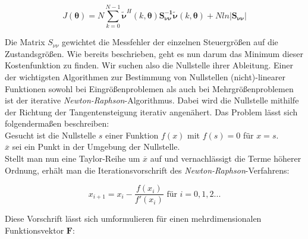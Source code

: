 \begin{equation}
    J(\mathbf{\theta})=N \sum\limits_{k=0}^{N-1}\mathbf{\tilde{\nu}}^H(k,\mathbf{\theta})\mathbf{S_{\nu\nu}^{-1}}\mathbf{\tilde{\nu}}(k,\mathbf{\theta})+Nln|\mathbf{S_{\nu\nu}}|
	\label{eq:Kostenfunktion}
\end{equation}  

Die Matrix $S_{\nu\nu}$ gewichtet die Messfehler der einzelnen Steuergrößen auf die Zustandsgrößen. 
Wie bereits beschrieben, geht es nun darum das Minimum dieser Kostenfunktion zu finden. Wir suchen also die Nullstelle ihrer 
Ableitung. Einer der wichtigsten Algorithmen zur Bestimmung von Nullstellen (nicht)-linearer Funktionen sowohl bei 
Eingrößenproblemen als auch bei Mehrgrößenproblemen ist der iterative \textit{Newton-Raphson}-Algorithmus. Dabei wird die 
Nullstelle 
mithilfe der Richtung der Tangentensteigung iterativ angenähert. Das Problem lässt sich folgendermaßen beschreiben: \noindent 
\\

\noindent \tab Gesucht ist die Nullstelle $ s $ einer Funktion $f(x)$ mit $f(s)=0$ für $x=s$. \\
\tab $\overline{x}$ sei ein Punkt in der Umgebung der Nullstelle.\\

Stellt man nun eine Taylor-Reihe um $\overline{x}$ auf und vernachlässigt die Terme höherer Ordnung, erhält man die 
Iterationsvorschrift des \textit{Newton-Raphson}-Verfahrens:

 \begin{equation}
	x_{i+1} = x_{i} - \frac{f(x_{i})}{f'(x_{i})} \text{ für }i=0,1,2...
	\label{eq:Newton_Raphson}
\end{equation}  

Diese Vorschrift lässt sich umformulieren für einen mehrdimensionalen Funktionsvektor $\mathbf{F}$:

